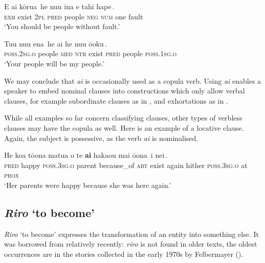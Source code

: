 \ea\label{ex:9.103}
\gll E ai {\ob}kōrua\,{\cb} {\ob}he nu{\ꞌ}u {\ꞌ}ina e tahi hape\,{\cb}. \\
\textsc{exh} exist {\db}\textsc{2pl} {\db}\textsc{pred} people \textsc{neg} \textsc{num} one fault \\

\glt 
‘You should be people without fault.’ \textstyleExampleref{[Mat. 5:48]}
\z

\ea\label{ex:9.104}
\gll {\ob}Tu{\ꞌ}u nu{\ꞌ}u ena\,{\cb} he ai {\ob}he nu{\ꞌ}u ō{\ꞌ}oku\,{\cb}. \\
{\db}\textsc{poss.2sg.o} people \textsc{med} \textsc{ntr} exist {\db}\textsc{pred} people \textsc{poss.1sg.o} \\

\glt
‘Your people will be my people.’ \textstyleExampleref{[Ruth 1:16]}
\z

We may conclude that \textit{ai} is occasionally used as a copula verb. Using \textit{ai} enables a speaker to embed nominal clauses into constructions which only allow verbal clauses, for example subordinate clauses as in , and exhortations as in .

While all examples so far concern classifying clauses, other types of verbless clauses may have the copula as well. Here is an example of a locative clause. Again, the subject is possessive, as the verb \textit{ai} is nominalised. 

\ea\label{ex:9.105}
\gll He koa tō{\ꞌ}ona matu{\ꞌ}a {\ꞌ}o te \textbf{ai} haka{\ꞌ}ou mai {\ob}ō{\ꞌ}ona\,{\cb} {\ob}{\ꞌ}i nei\,{\cb}.\\
\textsc{pred} happy \textsc{poss.3sg.o} parent because\_of \textsc{art} exist again hither {\db}\textsc{poss.3sg.o} {\db}at \textsc{prox}\\

\glt 
‘Her parents were happy because she was here again.’ \textstyleExampleref{[R441.018]}
\z

\subsection{\textit{Riro} ‘to become’}\label{sec:9.6.2}
\textit{Riro} ‘to become’ expresses the transformation of an entity into something else. It was borrowed from  relatively recently: \textit{riro} is not found in older texts, the oldest occurrences are in the stories collected in the early 1970s by Felbermayer (\citealt{Felbermayer1971,Felbermayer1973,Felbermayer1978}). 

